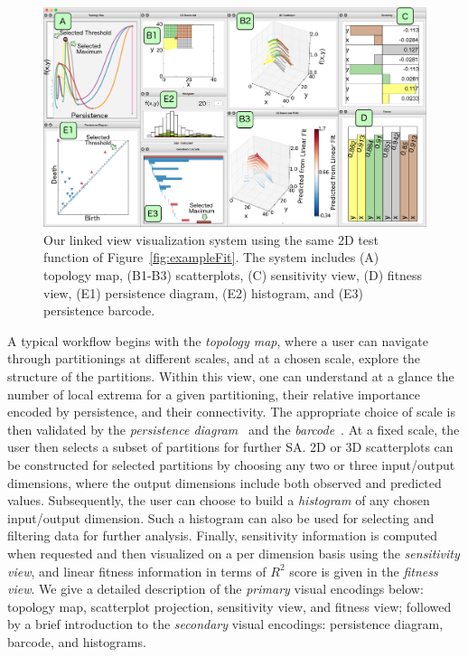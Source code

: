 \begin{figure}
  \centering
  \includegraphics[width=\linewidth]{figs/chap6/design-overview}
  \caption{Our linked view visualization system using the same 2D test function of Figure~\ref{fig:exampleFit}. The system includes (A) topology map,
  (B1-B3) scatterplots, (C) sensitivity view, (D) fitness view, (E1) persistence diagram, (E2) histogram, and (E3) persistence barcode.
  }
  \label{fig:design-overview}
\end{figure}

A typical workflow begins with the \emph{topology map}, where a user can navigate through partitionings at different scales, and at a chosen scale, explore the structure of the partitions.
%
Within this view, one can understand at a glance the number of local extrema for a given partitioning, their relative importance encoded by persistence, and their connectivity.
%
The appropriate choice of scale is then validated by the \emph{persistence diagram}~\cite{Cohen-SteinerEdelsbrunnerHarer2007} and the \emph{barcode}~\cite{CarlssonZomorodianCollins2004}.
%
At a fixed scale, the user then selects a subset of partitions for further SA.
%
2D or 3D scatterplots can be constructed for selected partitions by choosing any two or three input/output dimensions, where the output dimensions include both observed and predicted values.
%
Subsequently, the user can choose to build a \emph{histogram} of any chosen input/output dimension.
%
Such a histogram can also be used for selecting and filtering data for further analysis.
%
Finally, sensitivity information is computed when requested and then visualized on a per dimension basis using the \emph{sensitivity view}, and linear fitness information in terms of $R^2$ score is given in the \emph{fitness view}.
%
We give a detailed description of the \emph{primary} visual encodings below: topology map, scatterplot projection, sensitivity view, and fitness view;  followed by a brief introduction to the \emph{secondary} visual encodings: persistence diagram, barcode, and histograms.

